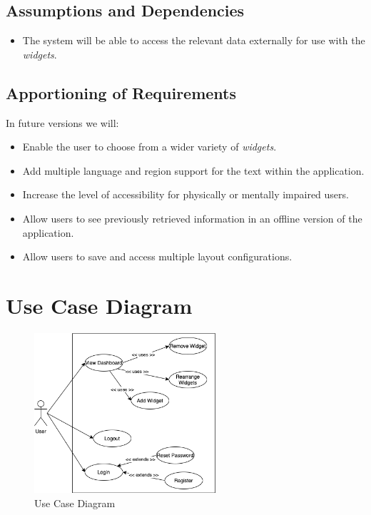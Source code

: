 \documentclass{article}
\begin{document}
\subsection{Assumptions and Dependencies}
\label{sub:assumptions_and_dependencies}
\begin{itemize}
    \item The system will be able to access the relevant data externally for use with the \textit{widgets}.
    
\end{itemize}

\subsection{Apportioning of Requirements}
\label{sub:apportioning_of_requirements}
In future versions we will:  
\begin{itemize}
    \item Enable the user to choose from a wider variety of \textit{widgets}.
    \item Add multiple language and region support for the text within the application.
    \item Increase the level of accessibility for physically or mentally impaired users.
    \item Allow users to see previously retrieved information in an offline version of the application.
    \item Allow users to save and access multiple layout configurations.
\end{itemize}

\newpage
\section{Use Case Diagram}
\label{sec:use_case_diagram}
\begin{figure}[h!]
\begin{center}
\includegraphics[width=0.6\textwidth]{Usecase.png}
\end{center}
\caption{Use Case Diagram}
\label{fig:use case diagram}
\end{figure}
\end{document}
